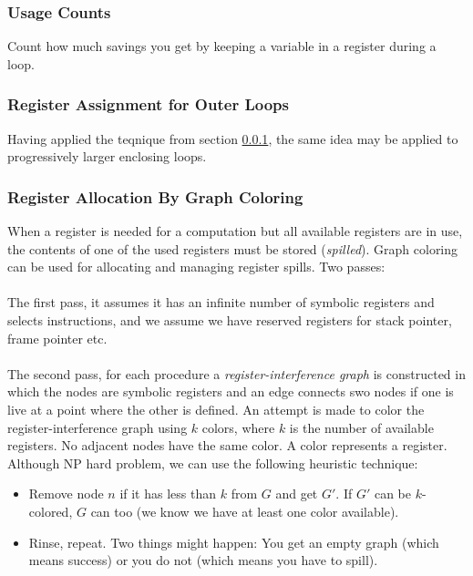 \documentclass{article}
\begin{document}
\subsubsection{Usage Counts} %
\label{ssub:Usage Counts}
Count how much savings you get by keeping a variable in a register during a loop.

\subsubsection{Register Assignment for Outer Loops} %
\label{ssub:Register Assignment for Outer Loops}
Having applied the teqnique from section \ref{ssub:Usage Counts}, the same idea may be applied to progressively larger enclosing loops.

\subsubsection{Register Allocation By Graph Coloring} %
\label{ssub:Register Allocation By Graph Coloring}
When a register is needed for a computation but all available registers are in use, the contents of one of the used registers must be stored (\emph{spilled}). Graph coloring can be used for allocating and managing register spills. Two passes:\\
\\
The first pass, it assumes it has an infinite number of symbolic registers and selects instructions, and we assume we have reserved registers for stack pointer, frame pointer etc. \\
\\
The second pass, for each procedure a \emph{register-interference graph} is constructed in which the nodes are symbolic registers and an edge connects swo nodes if one is live at a point where the other is defined. An attempt is made to color the register-interference graph using $k$ colors, where $k$ is the number of available registers. No adjacent nodes have the same color. A color represents a register. Although NP hard problem, we can use the following heuristic technique:
\begin{itemize}
	\item Remove node $n$ if it has less than $k$ from $G$ and get $G'$. If $G'$ can be $k$-colored, $G$ can too (we know we have at least one color available).
	\item Rinse, repeat. Two things might happen: You get an empty graph (which means success) or you do not (which means you have to spill).
\end{itemize}
\end{document}
